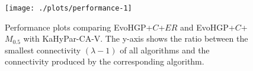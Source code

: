 \begin{figure}[b!]
\centering
\begin{knitrout}
\color{fgcolor}

{\centering \texttt{[image: ./plots/performance-1]} 

}

\end{knitrout}
\caption{Performance plots comparing EvoHGP+$C$+$ER$ and EvoHGP+$C$+$M_{0.5}$ with KaHyPar-CA-V. The y-axis shows the ratio between the smallest connectivity $(\lambda -1)$ of all algorithms and the connectivity produced by the corresponding algorithm.}\label{fig:app:perf}
\end{figure}
